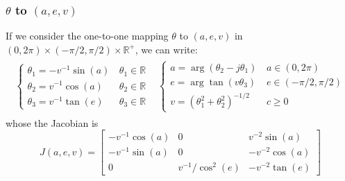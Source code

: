 \documentclass[a4paper, 12pt]{report}
\begin{document}
\subsubsection{$\theta$ to $(a,e,v)$ }
If we consider the one-to-one mapping $\theta$ to $(a,e,v)$ in $(0,2\pi)\times(-\pi/2,\pi/2)\times\mathds{R}^+$, we can write:
\begin{eqnarray*}
\begin{array}{cc}
 \left\{
 \begin{array}{ll}
 \theta_{1}=-v^{-1} \sin(a)&\, \theta_{1}\in\mathds{R}
 \\
 \theta_{2}=v^{-1}  \cos(a)&\,\theta_{2}\in\mathds{R}
 \\
 \theta_{3}=v^{-1}\tan(e)&\, \theta_{3}\in\mathds{R}
 \end{array}\right.
&
 \left\{
 \begin{array}{ll}
 a=\arg(\theta_{2}-j \theta_{1})& \, a\in(0,2\pi)
  \\
e=\arg\tan(v\theta_{3})& \,e\in(-\pi/2,\pi/2)
 \\
 v=(\theta_{1}^{2}+ \theta_{2}^{2})^{-1/2}& \, c \geq 0
 \end{array}\right.
\end{array}
\end{eqnarray*}
whose the Jacobian is
\begin{equation}
 \label{eq:jacobianaecv2theta}
 J(a,e,v)
 = 
 \begin{bmatrix}
-v^{-1}\cos(a)&0&v^{-2}\sin(a)
\\
-v^{-1}\sin(a)&0&-v^{-2}\cos(a)
\\
0&v^{-1}/\cos^2(e)&-v^{-2}\tan(e)
\end{bmatrix}
\end{equation}

\end{document}
